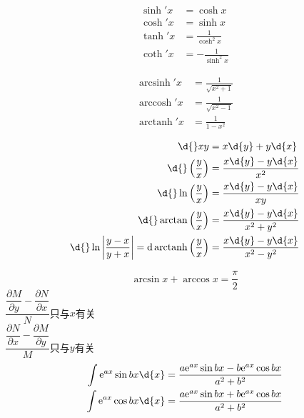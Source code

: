 \documentclass{article}
\DeclareMathOperator{\arccosh}{arccosh}
\DeclareMathOperator{\arcsinh}{arcsinh}
\DeclareMathOperator{\arctanh}{arctanh}
\begin{document}
\begin{align*}
    \sinh' x & = \cosh x                \\
    \cosh' x & = \sinh x                \\
    \tanh' x & = \frac{1}{\cosh^{2}x}   \\
    \coth' x & =- \frac{1}{\sinh^{2} x}
\end{align*}

\begin{align*}
    \arcsinh' x & =\frac{1}{\sqrt{x^{2}+1}} \\
    \arccosh' x & =\frac{1}{\sqrt{x^{2}-1}} \\
    \arctanh' x & =\frac{1}{1-x^{2}}
\end{align*}

\begin{align*}
    \d{ }xy
    & =x\d{y}+y\d{x}                     \\
    \d{ }\left( \frac{y}{x} \right)
    & =\frac{x\d{y}-y\d{x}}{x^{2}}       \\
    \d{ }\ln \left( \frac{y}{x} \right)
    & =\frac{x\d{y}-y\d{x}}{xy}          \\
    \d{ }\arctan \left( \frac{y}{x} \right)
    & =\frac{x\d{y}-y\d{x}}{x^{2}+y^{2}} \\
    \d{ }\ln \left| \frac{y - x}{y + x} \right|=\mathrm{d}
    \arctanh \left( \frac{y}{x} \right) &
    =\frac{x\d{y}-y\d{x}}{x^{2}-y^{2}} \\
\end{align*}

\[\arcsin x +\arccos x =\frac{\pi}{2} \]
\(\dfrac{\dfrac{\partial M}{\partial y} - \dfrac{\partial N}{\partial
x}}{N}\)只与\(x\)有关 \\
\(\dfrac{\dfrac{\partial N}{\partial x} - \dfrac{\partial M}{\partial
y}}{M}\)只与\(y\)有关 \\

\begin{align*}
    \int \e^{ax} \sin bx \d{x} & =\frac{a\e^{ax} \sin bx -
    b\e^{ax}\cos bx}{a^{2}+b^{2}} \\
    \int \e^{ax} \cos bx \d{x} & =\frac{a\e^{ax} \sin bx +
    b\e^{ax}\cos bx}{a^{2}+b^{2}} \\
\end{align*}
\end{document}
